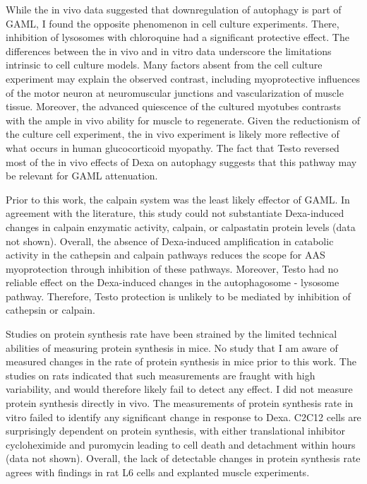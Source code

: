\documentclass[12pt,english]{report}\usepackage[]{graphicx}\usepackage[]{color}
\begin{document}
While the in vivo data suggested that downregulation of autophagy
is part of GAML, I found the opposite phenomenon in cell culture experiments.
There, inhibition of lysosomes with chloroquine had a significant
protective effect. The differences between the in vivo and in vitro
data underscore the limitations intrinsic to cell culture models.
Many factors absent from the cell culture experiment may explain the
observed contrast, including myoprotective influences of the motor
neuron at neuromuscular junctions and vascularization of muscle tissue.
Moreover, the advanced quiescence of the cultured myotubes contrasts
with the ample in vivo ability for muscle to regenerate. Given the
reductionism of the culture cell experiment, the in vivo experiment
is likely more reflective of what occurs in human glucocorticoid myopathy.
The fact that Testo reversed most of the in vivo effects of Dexa on
autophagy suggests that this pathway may be relevant for GAML attenuation.

Prior to this work, the calpain system was the least likely effector
of GAML. In agreement with the literature, this study could not substantiate
Dexa-induced changes in calpain enzymatic activity, calpain, or calpastatin
protein levels (data not shown). Overall, the absence of Dexa-induced
amplification in catabolic activity in the cathepsin and calpain pathways
reduces the scope for AAS myoprotection through inhibition of these
pathways. Moreover, Testo had no reliable effect on the Dexa-induced
changes in the autophagosome - lysosome pathway. Therefore, Testo
protection is unlikely to be mediated by inhibition of cathepsin or
calpain.

Studies on protein synthesis rate have been strained by the limited
technical abilities of measuring protein synthesis in mice. No study
that I am aware of measured changes in the rate of protein synthesis
in mice prior to this work. The studies on rats indicated that such
measurements are fraught with high variability, and would therefore
likely fail to detect any effect. I did not measure protein synthesis
directly in vivo. The measurements of protein synthesis rate in vitro
failed to identify any significant change in response to Dexa. C2C12
cells are surprisingly dependent on protein synthesis, with either
translational inhibitor cycloheximide and puromycin leading to cell
death and detachment within hours (data not shown). Overall, the lack
of detectable changes in protein synthesis rate agrees with findings
in rat L6 cells \citep{menconi2008dexamethasone} and explanted muscle
experiments\citep{dardevet1998glucocorticoid}.
\end{document}

